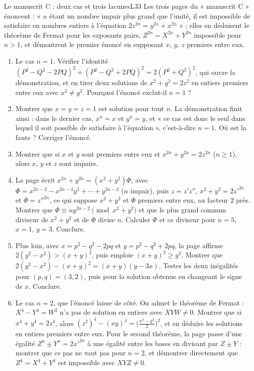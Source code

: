 \documentclass[11pt,a4paper]{article}
\begin{document}
\begin{exercice}{Le manuscrit C : deux cas et trois lacunes}{L3}{3}
Les trois pages du « manuscrit C » énoncent : « $n$ étant un nombre impair plus grand
que l'unité, il est impossible de satisfaire en nombres entiers à l'équation
$2z^{2n} = y^{2n} + x^{2n}$ » ; elles en déduisent le théorème de Fermat pour les
exposants pairs, $Z^{2n} = X^{2n} + Y^{2n}$ impossible pour $n > 1$, et démontrent le
premier énoncé en supposant $x$, $y$, $z$ premiers entre eux.
\begin{enumerate}
\item Le cas $n = 1$. Vérifier l'identité $(P^2 - Q^2 - 2PQ)^2 + (P^2 - Q^2 + 2PQ)^2 =
  2(P^2 + Q^2)^2$, qui ouvre la démonstration, et en tirer deux solutions de
  $x^2 + y^2 = 2z^2$ en entiers premiers entre eux avec $x^2 \neq y^2$. Pourquoi
  l'énoncé exclut-il $n = 1$ ?
\item Montrer que $x = y = z = 1$ est solution pour tout $n$. La démonstration finit
  ainsi : dans le dernier cas, $x^n = x$ et $y^n = y$, et « ce cas est donc le seul
  dans lequel il soit possible de satisfaire à l'équation », c'est-à-dire $n = 1$. Où
  est la faute ? Corriger l'énoncé.
\item Montrer que si $x$ et $y$ sont premiers entre eux et $x^{2n} + y^{2n} =
  2z^{2n}$ ($n \ge 1$), alors $x$, $y$ et $z$ sont impairs.
\item La page écrit $x^{2n} + y^{2n} = (x^2 + y^2)\Phi$, avec
  $\Phi = x^{2n-2} - x^{2n-4}y^2 + \cdots + y^{2n-2}$ ($n$ impair), puis $z = z'z''$,
  $x^2 + y^2 = 2z'^{2n}$ et $\Phi = z''^{2n}$, ce qui suppose $x^2 + y^2$ et $\Phi$
  premiers entre eux, au facteur $2$ près. Montrer que $\Phi \equiv ny^{2n-2}
  \pmod{x^2+y^2}$ et que le plus grand commun diviseur de $x^2+y^2$ et de $\Phi$ divise
  $n$. Calculer $\Phi$ et ce diviseur pour $n = 5$, $x = 1$, $y = 3$. Conclure.
\item Plus loin, avec $x = p^2 - q^2 - 2pq$ et $y = p^2 - q^2 + 2pq$, la page affirme
  $2(y^2 - x^2) > (x+y)^2$, puis emploie $(x+y)^2 \ge y^2$. Montrer que
  $2(y^2 - x^2) - (x+y)^2 = (x+y)(y - 3x)$. Tester les deux inégalités pour
  $(p,q) = (3,2)$, puis pour la solution obtenue en changeant le signe de $x$.
  Conclure.
\item Le cas $n = 2$, que l'énoncé laisse de côté. On admet le théorème de Fermat :
  $X^4 - Y^4 = W^2$ n'a pas de solution en entiers avec $XYW \neq 0$.
  Montrer que si $x^4 + y^4 = 2z^4$, alors $(z^2)^4 - (xy)^4 =
  \bigl(\frac{x^4-y^4}{2}\bigr)^2$, et en déduire les solutions en entiers premiers
  entre eux. Pour le second théorème, la page passe d'une égalité $Z^n \pm Y^n =
  2x'^{2n}$ à une égalité entre les bases en divisant par $Z \pm Y$ : montrer que ce
  pas ne vaut pas pour $n = 2$, et démontrer directement que $Z^4 = X^4 + Y^4$ est
  impossible avec $XYZ \neq 0$.
\end{enumerate}
\end{exercice}
\end{document}
